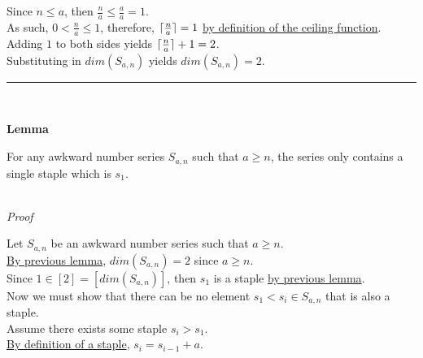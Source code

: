 \documentclass[a4paper,12pt]{article}
\DeclarePairedDelimiter{\ceil}{\lceil}{\rceil}
\begin{document}
\noindent Since $n \leq a$, then $\frac{n}{a} \leq \frac{a}{a} = 1$.\\

\noindent As such, $0 < \frac{n}{a} \leq 1$, therefore, $\ceil{\frac{n}{a}} = 1$ \hyperlink{definition:ceiling_function}{by definition of the ceiling function}.\\

\noindent Adding $1$ to both sides yields $\ceil{\frac{n}{a}} + 1 = 2$.\\

\noindent Substituting in $dim(S_{a, n})$ yields $dim(S_{a,n}) = 2$.\\

\begin{center}
\noindent\rule{8cm}{0.4pt}
\end{center}
\noindent \\









\label{lemma:only_staple}
\hypertarget{lemma:only_staple}{}
\begin{tcolorbox}
\textbf{Lemma}

\noindent For any awkward number series $S_{a,n}$ such that $a \geq n$, the series only contains a single staple which is $s_1$.

\end{tcolorbox}

\noindent \\
\textit{Proof}

\noindent Let $S_{a, n}$ be an awkward number series such that $a \geq n$.\\

\noindent \hyperlink{lemma:dimension_a_greater_equal_n}{By previous lemma}, $dim(S_{a, n}) = 2$ since $a \geq n$.\\

\noindent Since $1 \in [2] = [dim(S_{a, n})]$, then $s_1$ is a staple \hyperlink{lemma:initial_staples}{by previous lemma}.\\

\noindent Now we must show that there can be no element $s_1 < s_i \in S_{a, n}$ that is also a staple.\\

\noindent Assume there exists some staple $s_i > s_1$.\\

\noindent \hyperlink{definition:staple}{By definition of a staple}, $s_i = s_{i - 1} + a$.\\
\end{document}
